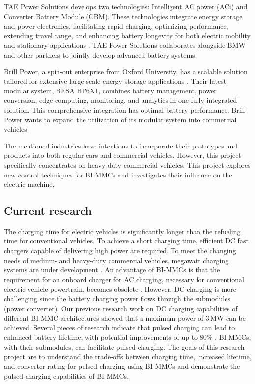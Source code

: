 \documentclass{article}
\begin{document}
TAE Power Solutions develops two technologies: Intelligent AC power (ACi) and Converter Battery Module (CBM). These technologies integrate energy storage and power electronics, facilitating rapid charging, optimizing performance, extending travel range, and enhancing battery longevity for both electric mobility and stationary applications \cite{TAETech}. TAE Power Solutions collaborates alongside BMW and other partners to jointly develop advanced battery systems.

Brill Power, a spin-out enterprise from Oxford University, has a scalable solution tailored for extensive large-scale energy storage applications \cite{BrillPower}. Their latest modular system, BESA BP6X1, combines battery management, power conversion, edge computing, monitoring, and analytics in one fully integrated solution. This comprehensive integration has optimal battery performance. Brill Power wants to expand the utilization of its modular system into commercial vehicles.

The mentioned industries have intentions to incorporate their prototypes and products into both regular cars and commercial vehicles. However, this project specifically concentrates on heavy-duty commercial vehicles.
This project explores new control techniques for BI-MMCs and investigates their influence on the electric machine. %

\subsection{Current research}
The charging time for electric vehicles is significantly longer than the refueling time for conventional vehicles. To achieve a short charging time, efficient DC fast chargers capable of delivering high power are required. To meet the changing needs of medium- and heavy-duty commercial vehicles, megawatt charging systems are under development \cite{meintz2022charging}. An advantage of BI-MMCs is that the requirement for an onboard charger for AC charging, necessary for conventional electric vehicle powertrain, becomes obsolete \cite{buberger2021charging}. However, DC charging is more challenging since the battery charging power flows through the submodules (power converter). Our previous research work on DC charging capabilities of different BI-MMC architectures \cite{balachandran2023dc} showed that a maximum power of 3\,MW can be achieved. 
Several pieces of research indicate that pulsed charging can lead to enhanced battery lifetime, with potential improvements of up to 80\% \cite{huang2020review,huang2021effects}.
BI-MMCs, with their submodules, can facilitate pulsed charging. 
The goals of this research project are to understand the trade-offs between charging time, increased lifetime, and converter rating for pulsed charging using BI-MMCs and demonstrate the pulsed charging capabilities of BI-MMCs.
\end{document}
